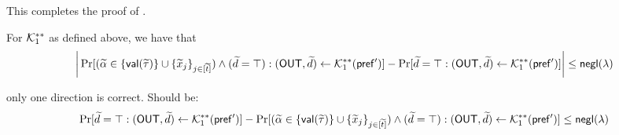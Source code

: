 This completes the proof of .

\iffalse 
\begin{MyClaim}\label{pq:claim:G1dprime:ub:comval}  
For $\mathcal{K}_1^{**}$ as defined above, we have that
$$ \bigg| \Pr[(\widetilde{\alpha} \in \{\mathsf{val}(\widetilde{\tau})\} \cup \{\widetilde{x}_j\}_{j \in [\widetilde{t}]}) \wedge (\widetilde{d} = \top): (\mathsf{OUT},\widetilde{d}) \gets \mathcal{K}_1^{**}(\mathsf{pref'})] - \Pr[\widetilde{d} = \top : (\mathsf{OUT},\widetilde{d}) \gets \mathcal{K}_1^{**}(\mathsf{pref'})] \bigg| \le \mathsf{negl}(\lambda)$$
\end{MyClaim}
\begin{xiaoenv}{}
only one direction is correct. Should be:
$$  \Pr[\widetilde{d} = \top : (\mathsf{OUT},\widetilde{d}) \gets \mathcal{K}_1^{**}(\mathsf{pref'})]  - \Pr[(\widetilde{\alpha} \in \{\mathsf{val}(\widetilde{\tau})\} \cup \{\widetilde{x}_j\}_{j \in [\widetilde{t}]}) \wedge (\widetilde{d} = \top): (\mathsf{OUT},\widetilde{d}) \gets \mathcal{K}_1^{**}(\mathsf{pref'})]  \le \mathsf{negl}(\lambda)$$
\end{xiaoenv}



